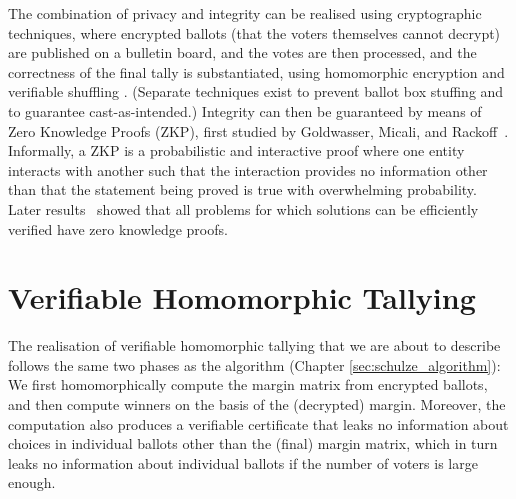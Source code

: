 The combination of privacy and integrity can be realised using cryptographic techniques, where
encrypted ballots (that the voters themselves cannot decrypt) are
published on a bulletin board, and the votes are then processed, and
the correctness of the final tally is substantiated, using
homomorphic encryption \citep{Hirt:2000:ERF} and verifiable shuffling
\citep{Bayer:2012:EZK}. (Separate techniques exist to prevent ballot
box stuffing and to guarantee cast-as-intended.)
Integrity can then be guaranteed by means of Zero Knowledge Proofs
(ZKP),
first studied by Goldwasser, Micali, and Rackoff~\citep{Goldwasser:1985:STOC}.
Informally, a ZKP is a probabilistic and interactive proof where one
entity interacts with another such that the interaction provides
no information other than that the statement being proved is true with
overwhelming probability. 
Later results~\citep{Ben-Or:1988:CRYPTO,Goldreich:1991:ACM}
showed that 
all problems for which solutions can be efficiently verified have zero knowledge
proofs.

  
 \section{Verifiable Homomorphic Tallying}
The realisation of verifiable homomorphic tallying that we are about to
describe follows the same two phases as the algorithm (Chapter \ref{sec:schulze_algorithm}): 
We first homomorphically compute the margin matrix from encrypted ballots, and then compute
winners on the basis of the (decrypted) margin. Moreover, the computation also
produces a verifiable certificate that leaks no information about
choices in individual ballots other than the (final) margin matrix, which in
turn leaks no information about individual ballots if the number of
voters is large enough. 



